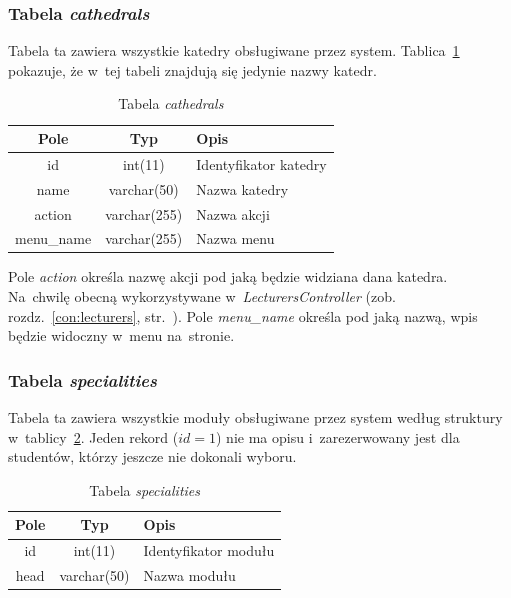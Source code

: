 \documentclass[a4paper,12pt,oneside]{report}
\begin{document}
\subsubsection{Tabela \emph{cathedrals}}
\label{subsub:cathedrals}

Tabela ta zawiera wszystkie katedry obsługiwane przez system. Tablica~\ref{tab:cathedrals} pokazuje, że w~tej tabeli znajdują się jedynie nazwy katedr.
\begin{table}[h]
  \centering
  \begin{tabular}{|c|c|l|}\hline
  Pole & Typ & Opis \\\hline
  id              & int(11)      & Identyfikator katedry\\
  name & varchar(50) & Nazwa katedry \\
  action & varchar(255) & Nazwa akcji \\
  menu\_name & varchar(255) & Nazwa menu \\\hline
  \end{tabular}
  \caption{Tabela \emph{cathedrals}\label{tab:cathedrals}}
\end{table}

Pole \emph{action} określa nazwę akcji pod jaką będzie widziana dana katedra. Na~chwilę obecną wykorzystywane w~\emph{LecturersController} (zob. rozdz.~\ref{con:lecturers}, str.~\pageref{con:lecturers}). Pole \emph{menu\_name} określa pod jaką nazwą, wpis będzie widoczny w~menu na~stronie.

\subsubsection{Tabela \emph{specialities}}
\label{subsub:specialities}

Tabela ta zawiera wszystkie moduły obsługiwane przez system według struktury w~tablicy~\ref{tab:specialities}. Jeden rekord ($id = 1$) nie ma opisu i~zarezerwowany jest dla studentów, którzy jeszcze nie dokonali wyboru.
\begin{table}[h]
  \centering
  \begin{tabular}{|c|c|l|}\hline
  Pole & Typ & Opis \\\hline
  id              & int(11)      & Identyfikator modułu\\
  head & varchar(50) & Nazwa modułu \\\hline
  \end{tabular}
  \caption{Tabela \emph{specialities}\label{tab:specialities}}
\end{table}
\end{document}
